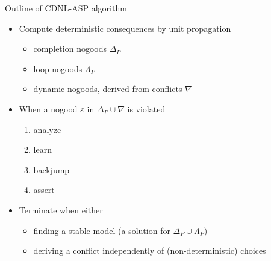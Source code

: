 \begin{frame}{Outline of CDNL-ASP algorithm}
  \begin{itemize}
    \item<2-> Compute deterministic consequences by unit propagation
      \begin{itemize}
        \item completion nogoods                                         \hfill $\Delta_P$
        \item<2-5,7-> loop nogoods \hfill $\Lambda_P$\kern 1pt
        \item<3-> dynamic nogoods, derived from \alert<3>{conflicts} \hfill $\nabla\phantom{_P}$
      \end{itemize}
    \item<8-> When a nogood $\varepsilon$ in $\Delta_P\cup\nabla$ is \alert<7>{violated}
      \begin{enumerate}
        \item<9-> \alert<9-13>{analyze}
        \item<9-> \alert<9-13>{learn}
        \item<9-> \alert<9-13>{backjump}
        \item<9-> \alert<9-13>{assert}
      \end{enumerate}
    \item<16-> Terminate when either
      \begin{itemize}
        \item<17-> finding a stable model (a solution for $\Delta_P\cup\Lambda_P$)
        \item<18-> deriving a conflict independently of (non-deterministic) choices
      \end{itemize}
  \end{itemize}
\end{frame}
